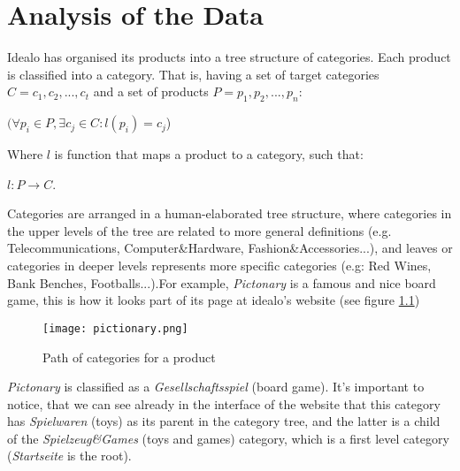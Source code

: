 \chapter{Analysis of the Data\label{cha:chapter4}}

Idealo has organised its products into a tree structure of categories. Each product is classified into a category. That is, having a set of target categories $C = {c_1, c_2, ..., c_t}$ and a set of products $P = {p_1, p_2, ..., p_n}$:

\begin{center}
    $(\forall p_i \in P, \exists c_j \in C : l(p_i) = c_j $)  \\
\end{center}

Where $l$ is function that maps a product to a category, such that:\\

\begin{center}
    $l: P \rightarrow C$. \label{eq:classifierFunction}\\
\end{center}

Categories are arranged in a human-elaborated tree structure, where categories in the upper levels of the tree are related to more general definitions (e.g. Telecommunications, Computer\&Hardware, Fashion\&Accessories...), and leaves or categories in deeper levels represents more specific categories (e.g: Red Wines, Bank Benches, Footballs...).For example, \textit{Pictonary} is a famous and nice board game, this is how it looks part of its page at idealo's website (see figure \ref{fig:pictionary})

\begin{figure}[!htbp]
  \centering
  \texttt{[image: pictionary.png]}\\
  \caption{Path of categories for a product}
  \label{fig:pictionary}
\end{figure}

\textit{Pictonary} is classified as a \textit{Gesellschaftsspiel} (board game). It's important to notice, that we can see already in the interface of the website that this category has \textit{Spielwaren} (toys) as its parent in the category tree, and the latter is a child of the \textit{Spielzeug\&Games} (toys and games) category, which is a first level category (\textit{Startseite} is the root).

